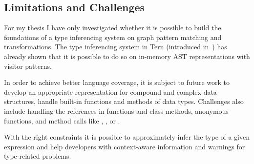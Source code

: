 \subsection{Limitations and Challenges}
For my thesis I have only investigated whether it is possible to build the foundations of a type inferencing system on graph pattern matching and transformations. The type inferencing system in Tern (introduced in~) has already shown that it is possible to do so on in-memory AST representations with visitor patterns.

In order to achieve better language coverage, it is subject to future work to develop an appropriate representation for compound and complex data structures, handle built-in functions and methods of data types. Challenges also include handling the  references in functions and class methods, anonymous functions, and method calls like , , or .

With the right constraints it is possible to approximately infer the type of a given expression and help developers with context-aware information and warnings for type-related problems.

